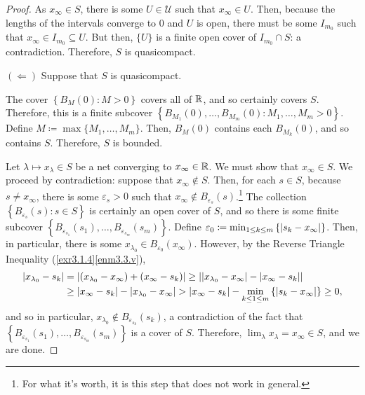 \begin{thm}
\begin{proof}
As $x_\infty \in S$, there is some $U\in \mathcal{U}$ such that $x_\infty \in U$.  Then, because the lengths of the intervals converge to $0$ and $U$ is open, there must be some $I_{m_0}$ such that $x_\infty \in I_{m_0}\subseteq U$.  But then, $\{ U\}$ is a finite open cover of $I_{m_0}\cap S$:  a contradiction.  Therefore, $S$ is quasicompact.

\blankline
\noindent
$(\Leftarrow )$
Suppose that $S$ is quasicompact.

The cover $\left\{ B_M(0):M>0\right\}$ covers all of $\mathbb{R}$, and so certainly covers $S$.  Therefore, this is a finite subcover $\left\{ B_{M_1}(0),\ldots ,B_{M_m}(0):M_1,\ldots ,M_m>0\right\}$.  Define $M\coloneqq \max \{ M_1,\ldots ,M_m\}$.  Then, $B_M(0)$ contains each $B_{M_k}(0)$, and so contains $S$.  Therefore, $S$ is bounded.

Let $\lambda \mapsto x_\lambda \in S$ be a net converging to $x_\infty \in \mathbb{R}$.  We must show that $x_\infty \in S$.  We proceed by contradiction:  suppose that $x_\infty \notin S$.  Then, for each $s\in S$, because $s\neq x_\infty$, there is some $\varepsilon _s>0$ such that $x_\infty \notin B_{\varepsilon _s}(s)$.\footnote{For what it's worth, it is this step that does not work in general.}  The collection $\left\{ B_{\varepsilon _s}(s):s\in S\right\}$ is certainly an open cover of $S$, and so there is some finite subcover $\left\{ B_{\varepsilon _{s_1}}(s_1),\ldots ,B_{\varepsilon _{s_m}}(s_m)\right\}$.  Define $\varepsilon _0\coloneqq \min _{1\leq k\leq m}\left\{ \lvert s_k-x_\infty\rvert\right\}$.  Then, in particular, there is some $x_{\lambda _0}\in B_{\varepsilon _0}(x_\infty)$.  However, by the Reverse Triangle Inequality (\cref{exr3.1.4}\ref{enm3.3.v}),
\begin{equation}
\begin{split}
\lvert x_{\lambda _0}-s_k\rvert & =\left| (x_{\lambda _0}-x_\infty )+(x_\infty -s_k)\right| \geq \left| \left| x_{\lambda _0}-x_\infty \right| -\left| x_\infty -s_k\right| \right| \\
& \geq \left| x_\infty -s_k\right| -\left| x_{\lambda _0}-x_\infty \right| >\left| x_\infty -s_k\right| -\min _{k\leq 1\leq m}\left\{ \lvert s_k-x_\infty\rvert\right\} \geq 0,
\end{split}
\end{equation}
and so in particular, $x_{\lambda _0}\notin B_{\varepsilon _{s_k}}(s_k)$, a contradiction of the fact that $\left\{ B_{\varepsilon _{s_1}}(s_1),\ldots ,B_{\varepsilon _{s_m}}(s_m)\right\}$ is a cover of $S$.  Therefore, $\lim _\lambda x_\lambda =x_\infty \in S$, and we are done.
\end{proof}
\end{thm}

